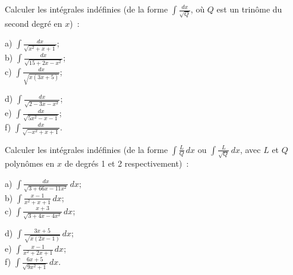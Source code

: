 \documentclass[12pt,french,oneside,a4paper]{memoir} %
\begin{document}
\begin{exo}
Calculer les intégrales indéfinies (de la forme
$\displaystyle{\int\frac{dx}{\sqrt Q}}$, où $Q$ est un trinôme
du second degré en $x$)~:\\

\hfill
\begin{minipage}[t]{6cm}
a) $\displaystyle{\int \frac{dx}{\sqrt{x^2+x+1}}}$;\\[2mm]
b) $\displaystyle{\int \frac{dx}{\sqrt{15+2x-x^2}}}$;\\[2mm]
c) $\displaystyle{\int \frac{dx}{\sqrt{x(3x+5)}}}$;
\end{minipage}
\hfill
\begin{minipage}[t]{8cm}
d) $\displaystyle{\int \frac{dx}{\sqrt{2-3x-x^2}}}$;\\[2mm]
e) $\displaystyle{\int \frac{dx}{\sqrt{5x^2-x-1}}}$;\\[2mm]
f) $\displaystyle{\int\frac{dx}{\sqrt{-x^2+x+1}}}$.\\[2mm]
\end{minipage}
\hfill
\end{exo}
\begin{exo}
Calculer les intégrales indéfinies (de la forme
$\displaystyle{\int\frac{L}{Q}\,dx}$ ou 
$\displaystyle{\int\frac{L}{\sqrt Q}}\,dx$, avec $L$ et $Q$
polynômes en $x$ de degrés 1 et 2 respectivement)~:\\

\hfill
\begin{minipage}[t]{6cm}
a) $\displaystyle{\int \frac{dx}{\sqrt{3+66x-11x^2}}\,dx}$;\\[2mm]
b) $\displaystyle{\int \frac{x-1}{x^2+x+1}\,dx}$;\\[2mm]
c) $\displaystyle{\int \frac{x+3}{\sqrt{3+4x-4x^2}}\,dx}$;
\end{minipage}
\hfill
\begin{minipage}[t]{8cm}
d) $\displaystyle{\int \frac{3x+5}{\sqrt{x(2x-1)}}\,dx}$;\\[2mm]
e) $\displaystyle{\int \frac{x-1}{x^2+2x+1}\,dx}$;\\[2mm]
f) $\displaystyle{\int \frac{6x+5}{\sqrt{9x^2+1}}\,dx}$.
\end{minipage}
\hfill
\end{exo}
\end{document}

